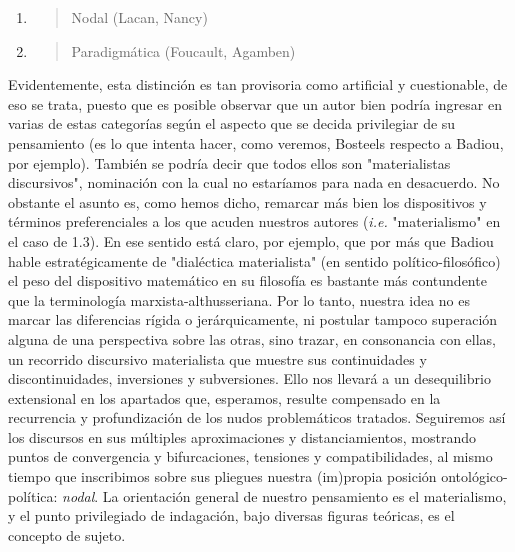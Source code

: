 \documentclass{book}
\begin{document}
\begin{enumerate}
\begin{enumerate}
    \begin{enumerate}
    \def\labelenumiii{\arabic{enumiii}.}
    \setcounter{enumiii}{1}
    \item
      \begin{quote}
      Nodal (Lacan, Nancy)
      \end{quote}
    \item
      \begin{quote}
      Paradigmática (Foucault, Agamben)
      \end{quote}
    \end{enumerate}
  \end{enumerate}
\end{enumerate}

Evidentemente, esta distinción es tan provisoria como artificial y
cuestionable, de eso se trata, puesto que es posible observar que un
autor bien podría ingresar en varias de estas categorías según el
aspecto que se decida privilegiar de su pensamiento (es lo que intenta
hacer, como veremos, Bosteels respecto a Badiou, por ejemplo). También
se podría decir que todos ellos son "materialistas discursivos",
nominación con la cual no estaríamos para nada en desacuerdo. No
obstante el asunto es, como hemos dicho, remarcar más bien los
dispositivos y términos preferenciales a los que acuden nuestros autores
(\emph{i.e.} "materialismo" en el caso de 1.3). En ese sentido está
claro, por ejemplo, que por más que Badiou hable estratégicamente de
"dialéctica materialista" (en sentido político-filosófico) el peso del
dispositivo matemático en su filosofía es bastante más contundente que
la terminología marxista-althusseriana. Por lo tanto, nuestra idea no es
marcar las diferencias rígida o jerárquicamente, ni postular tampoco
superación alguna de una perspectiva sobre las otras, sino trazar, en
consonancia con ellas, un recorrido discursivo materialista que muestre
sus continuidades y discontinuidades, inversiones y subversiones. Ello
nos llevará a un desequilibrio extensional en los apartados que,
esperamos, resulte compensado en la recurrencia y profundización de los
nudos problemáticos tratados. Seguiremos así los discursos en sus
múltiples aproximaciones y distanciamientos, mostrando puntos de
convergencia y bifurcaciones, tensiones y compatibilidades, al mismo
tiempo que inscribimos sobre sus pliegues nuestra (im)propia posición
ontológico-política: \emph{nodal}. La orientación general de nuestro
pensamiento es el materialismo, y el punto privilegiado de indagación,
bajo diversas figuras teóricas, es el concepto de sujeto.
\end{document}
